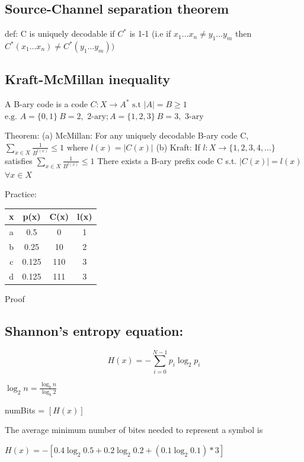 \documentclass{article}
\begin{document}
\subsection{Source-Channel separation theorem}

def: C is uniquely decodable if $C^*$ is 1-1
(i.e if $x_1 \dots x_n \ne y_1 \dots y_m$ then $C^*(x_1 \dots x_n) \ne C^*(y_1 \dots y_m))$

\subsection{Kraft-McMillan inequality}

A B-ary code is a code $ C : X \to A^* \text{ s.t } |A| = B \ge 1$
$ \text{e.g. } A = \{0, 1\} \: B = 2, \text{ 2-ary}; A = \{ 1, 2, 3 \} \: B = 3, \text{ 3-ary}$

Theorem:
(a) McMillan: For any uniquely decodable B-ary code C,
$\sum_{x\in X} \frac{1}{B^{l(x)}} \le 1 \text{ where } l(x) = |C(x)|$
(b) Kraft: If $ l: X \to \{1, 2, 3, 4, ...\}$ satisfies $\sum_{x \in X} \frac{1}{B^{l(x)}} \le 1$
There exists a B-ary prefix code C s.t. $ |C(x)| = l(x)$   $ \forall x \in X$

Practice: 

\begin{tabular}{| c | c | c | c |}
    \hline 
    x   & p(x) & C(x) & l(x) \\ \hline
    a   & 0.5  & 0    & 1    \\ \hline
    b   & 0.25 & 10   & 2    \\ \hline
    c   & 0.125& 110  & 3    \\ \hline
    d   & 0.125& 111  & 3    \\ \hline
\end{tabular}


Proof



\subsection{Shannon's entropy equation:}

\[
    H(x) = -\sum_{i=0}^{N-1} p_i\log_2{p_i}
\]

$\log_2{n} = \frac{\log_b{n}}{\log_b{2}}$

numBits = $[H(x)]$


The average minimum number of bites needed to represent a symbol is 

$H(x) = -[0.4\log_2{0.5} + 0.2\log_2{0.2}+ (0.1\log_2{0.1}) * 3]$
\end{document}
